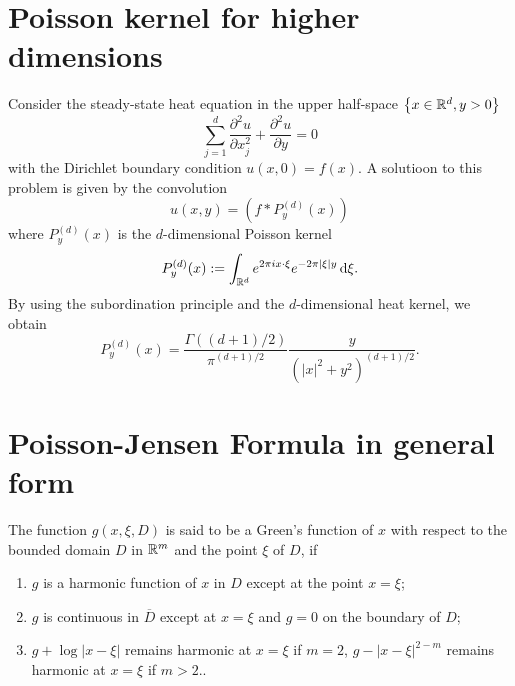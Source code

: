 \tableofcontents


\section{Poisson kernel for higher dimensions}
Consider the steady-state heat equation in the upper half-space $\left\{x\in \mathbb{R}^{d},y>0\right\} $ 
\[
\sum_{j=1}^{d} \frac{\partial^2 u}{\partial x_j^2} +\frac{\partial^2 u}{\partial y}=0
\] 
with the Dirichlet boundary condition $u(x,0)=f(x)$. A solutioon to this problem is given by the convolution 
\begin{equation}
u(x,y)=\left( f*P_y^{(d)}(x) \right) 
\end{equation} where $P_y^{(d)}(x)$ is the $d$-dimensional Poisson kernel
\begin{equation}
P_y^{(d)}(x):=\int_{\mathbb{R}^{d}}e^{2\pi i x \cdot \xi}e^{-2\pi |\xi|y}\,\mathrm{d} \xi.
\end{equation}
By using the subordination principle and the $d$-dimensional heat kernel, we obtain
\begin{equation}
P_y^{(d)}(x)= \frac{\Gamma \left( \left( d+1 \right) /2 \right) }{\pi ^{(d+1) /2}} \frac{y}{(|x|^2+y^2)^{(d+1) /2}}.
\end{equation}

\section{Poisson-Jensen Formula in general form}

\begin{definition}
	The function $g(x,\xi,D)$ is said to be a Green's function of  $x$ with respect to the bounded domain $D$ in $\mathbb{R}^{m}$ and the point $\xi$ of $D $, if 
	\begin{enumerate}
		\item $g$ is a harmonic function of $x$ in $D$ except at the point $x=\xi$;
		\item $g$ is continuous in $\overline{D}$ except at $x=\xi$ and $g=0$ on the boundary of $D$;
		\item $g+\log|x-\xi|$ remains harmonic at $x=\xi$ if $m=2$, $g-|x-\xi|^{2-m}$ remains harmonic at $x=\xi$ if $m>2$..
	\end{enumerate}
\end{definition}

